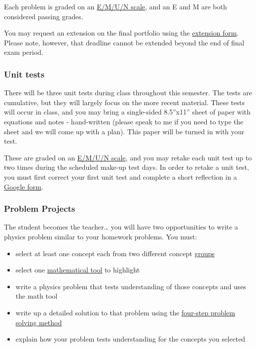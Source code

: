 \documentclass[
  letterpaper,
  DIV=11,
  numbers=noendperiod]{scrartcl}
\providecommand{\tightlist}{%
  \setlength{\itemsep}{0pt}\setlength{\parskip}{0pt}}\usepackage{longtable,booktabs,array}
\begin{document}
Each problem is graded on an \hyperref[emun]{E/M/U/N scale}, and an E
and M are both considered passing grades.

You may request an extension on the final portfolio using the
\href{https://forms.gle/eFx7y7FoSdoukKGC6}{extension form}. Please note,
however, that deadline cannot be extended beyond the end of final exam
period.

\subsubsection{Unit tests}

There will be three unit tests during class throughout this semester.
The tests are cumulative, but they will largely focus on the more recent
material. These tests will occur in class, and you may bring a
single-sided 8.5''x11'' sheet of paper with equations and notes -
hand-written (please speak to me if you need to type the sheet and we
will come up with a plan). This paper will be turned in with your test.

These are graded on an \hyperref[emun]{E/M/U/N scale}, and you may
retake each unit test up to two times during the scheduled make-up test
days. In order to retake a unit test, you must first correct your first
unit test and complete a short reflection in a
\href{https://forms.gle/rfhtp2ALtBY8JFGT9}{Google form}.

\subsubsection{Problem Projects}

The student becomes the teacher\ldots{} you will have two opportunities
to write a physics problem similar to your homework problems. You must:

\begin{itemize}
\tightlist
\item
  select at least one concept each from two different concept
  \href{coursecontent.qmd\#concepts}{groups}
\item
  select one \href{coursecontent.qmd\#mathtools}{mathematical tool} to
  highlight
\item
  write a physics problem that tests understanding of those concepts and
  uses the math tool
\item
  write up a detailed solution to that problem using the
  \href{coursecontent.qmd\#fourstepmethod}{four-step problem solving
  method}
\item
  explain how your problem tests understanding for the concepts you
  selected
\end{itemize}
\end{document}
